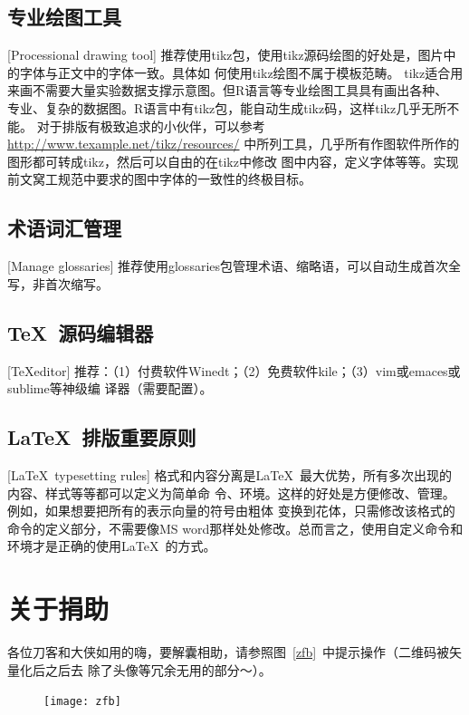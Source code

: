 \subsection{专业绘图工具}[Processional drawing tool]
\label{drawtool}
推荐使用tikz包，使用tikz源码绘图的好处是，图片中的字体与正文中的字体一致。具体如
何使用tikz绘图不属于模板范畴。
tikz适合用来画不需要大量实验数据支撑示意图。但R语言等专业绘图工具具有画出各种、
专业、复杂的数据图。R语言中有tikz包，能自动生成tikz码，这样tikz几乎无所不能。
对于排版有极致追求的小伙伴，可以参考
\href{http://www.texample.net/tikz/resources/}{http://www.texample.net/tikz/resources/}
中所列工具，几乎所有作图软件所作的图形都可转成tikz，然后可以自由的在tikz中修改
图中内容，定义字体等等。实现前文窝工规范中要求的图中字体的一致性的终极目标。


\subsection{术语词汇管理}[Manage glossaries]
推荐使用glossaries包管理术语、缩略语，可以自动生成首次全写，非首次缩写。

\subsection{\TeX\ 源码编辑器}[\TeX editor]
推荐：（1）付费软件Winedt；（2）免费软件kile；（3）vim或emaces或sublime等神级编
译器（需要配置）。

\subsection{\LaTeX\ 排版重要原则}[\LaTeX\ typesetting rules]
格式和内容分离是\LaTeX\ 最大优势，所有多次出现的内容、样式等等都可以定义为简单命
令、环境。这样的好处是方便修改、管理。例如，如果想要把所有的表示向量的符号由粗体
变换到花体，只需修改该格式的命令的定义部分，不需要像MS
word那样处处修改。总而言之，使用自定义命令和环境才是正确的使用\LaTeX\ 的方式。

\section{关于捐助}
各位刀客和大侠如用的嗨，要解囊相助，请参照图~\ref{zfb}~中提示操作（二维码被矢量化后之后去
除了头像等冗余无用的部分～）。

\begin{figure}[!h]
\centering\texttt{[image: zfb]}
\vspace{0.2em}
\end{figure}


